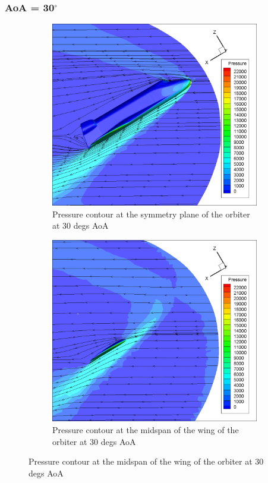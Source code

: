 \subsubsection{AoA = 30$^\circ$}

\begin{figure}[H]

	\centering
    \begin{subfigure}[b]{0.65\textwidth}
         \centering
		 \includegraphics[width=\textwidth]{report_images/30_sym_pressure_contour.png}
		 \caption{Pressure contour at the symmetry plane of the orbiter at 30 degs AoA}
		 \label{fig: 30_sym_pressure_contour}
    \end{subfigure} 
    \begin{subfigure}[b]{0.65\textwidth}
         \centering
		 \includegraphics[width=\textwidth]{report_images/30_wing_pressure_contour.png}
		 \caption{Pressure contour at the midspan of the wing of the orbiter at 30 degs AoA}
		 \label{fig: 30_wing_pressure_contour}
    \end{subfigure}
\end{figure}

